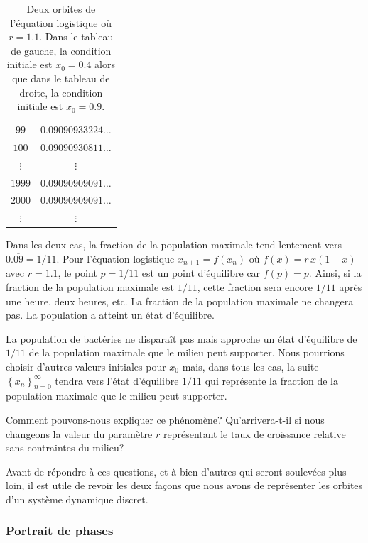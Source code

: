 {\begin{table}
{\begin{center}
\begin{tabular}{c|c}
$99$ & $0.09090933224\ldots$ \\ 
$100$ & $0.09090930811\ldots$ \\ 
$\vdots$ & $\vdots$ \\
$1999$ & $0.09090909091\ldots$ \\ 
$2000$ & $0.09090909091\ldots$ \\ 
$\vdots$ & $\vdots$ \\
\cline{1-2}
\end{tabular}
\end{center}
}
\caption[Calcul de deux orbites pour l'équation logistique
$x_{n+1} = 1.1 x_n ( 1-x_n)$.]{Deux orbites de l'équation logistique
où $r=1.1$.  Dans le tableau de gauche, la condition initiale est
$x_0 = 0.4$ alors que dans le tableau de droite, la condition
initiale est $x_0 = 0.9$.
\label{HS_LOGISTIC1}} 
\end{table}

Dans les deux cas, la fraction de la population maximale tend
lentement vers $0.\overline{09} = 1/11$.  Pour l'équation logistique
$x_{n+1} = f(x_n)$ où $f(x) = r\,x (1-x)$ avec $r=1.1$, le point
$p = 1/11$ est un point d'équilibre car $f(p) = p$.    Ainsi,
si la fraction de la population maximale est $1/11$, cette fraction
sera encore $1/11$ après une heure, deux heures, etc.  La fraction de
la population maximale ne changera pas. La population a atteint un
état d'équilibre. 

La population de bactéries ne disparaît pas mais approche un état
d'équilibre de $1/11$ de la population maximale que le milieu peut
supporter.  Nous pourrions choisir d'autres valeurs initiales pour $x_0$
mais, dans tous les cas, la suite
$\displaystyle \left\{x_n\right\}_{n=0}^\infty$ tendra vers l'état
d'équilibre $1/11$ qui représente la fraction de la population
maximale que le milieu peut supporter.

Comment pouvons-nous expliquer ce phénomène?  Qu'arrivera-t-il si nous
changeons la valeur du paramètre $r$ représentant le taux de
croissance relative sans contraintes du milieu?

Avant de répondre à ces questions, et à bien d'autres qui seront
soulevées plus loin, il est utile de revoir les deux façons que nous
avons de représenter les orbites d'un système dynamique discret.

\subsubsection{Portrait de phases}

}
